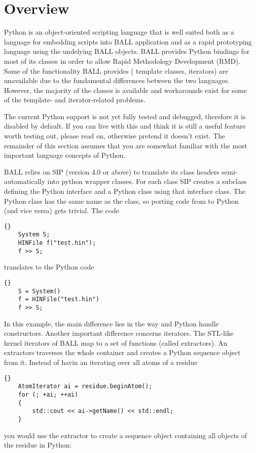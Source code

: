 \section{Overview}
Python is an object-oriented scripting language\cite{Python} that is well
suited both as a language for embedding scripts into BALL application and as a
rapid prototyping language using the undelying BALL objects.
BALL provides Python bindings for most of its classes in order to allow Rapid
Methodology Development (RMD). Some of the functionality BALL provides (\eg
template classes, iterators) are unavailable due to the fundamental differences 
between the two languages. However, the majority of the classes is available and
workarounds exist for some of the template- and iterator-related problems.

The current Python support is not yet fully tested and debugged, therefore it
is disabled by default. If you can live with
this and think it is still a useful feature worth testing out, please read on,
otherwise pretend it doesn't exist. The remainder of this section assumes that
you are somewhat familiar with the most important language concepts of Python.

BALL relies on SIP \cite{SIP} (version 4.0 or above) to translate its class
headers semi-automatically into python wrapper classes. For each \CPP class
SIP creates a subclass defining the Python interface and a Python class
using that \CPP interface class. The Python class has the same name as the
\CPP class, so porting code from \CPP to Python (and vice versa) gets trivial.
The \CPP code 

\begin{lstlisting}{}
	System S;
	HINFile f("test.hin");
	f >> S;
\end{lstlisting}

\noindent
translates to the Python code

\begin{lstlisting}{}
	S = System()
	f = HINFile("test.hin")
	f >> S;
\end{lstlisting}

\noindent
In this example, the main difference lies in the way \CPP and Python handle
constructors. Another important difference concerns iterators. The STL-like
kernel iterators of BALL map to a set of functions (called extractors). An
extractors traverses the whole container and creates a Python sequence object
from it. Instead of havin an  iterating over all atoms of
a residue

\begin{lstlisting}{}
	AtomIterator ai = residue.beginAtom();
	for (; +ai; ++ai)
	{
		std::cout << ai->getName() << std::endl;
	}
\end{lstlisting}
\noindent you would use the  extractor to create a sequence
object containing all objects of the residue in Python:

